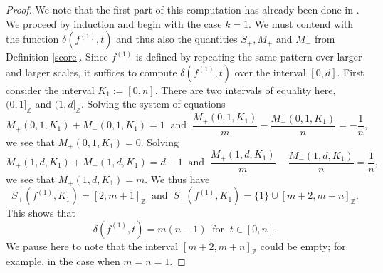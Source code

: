 \documentclass[reqno,11pt]{amsart}
\theoremstyle{plain}
\theoremstyle{definition}
\theoremstyle{remark}
\numberwithin{equation}{section}
\newcommand{\Z}{{\mathbb{Z}}}
\begin{document}
\begin{proof}
We note that the first part of this computation has already been done in \cite[Figure 4]{DFSU}.
We proceed by induction and begin with the case $k=1$. We must contend with the function $\delta(f^{(1)},t)$ and thus also the quantities $S_+, M_+$ and $M_-$ from Definition \ref{score}.
Since $f^{(1)}$ is defined by repeating the same pattern over larger and larger scales, it suffices to compute $\delta(f^{(1)}, t)$ over the interval $[0,d]$.
First consider the interval $K_1 := [0,n]$. There are two intervals of equality here, $(0, 1]_\Z$ and $(1,d]_\Z$.
Solving the system of equations
\begin{equation*}
    M_+(0,1,K_1) + M_-(0,1,K_1) = 1\ \text{ and }\ \frac{M_+(0,1,K_1)}{m} - \frac{M_-(0,1,K_1)}{n} = -\frac{1}{n},
\end{equation*}
we see that $M_+(0,1,K_1) = 0$.
Solving
\begin{equation*}
    M_+(1,d,K_1) + M_-(1,d,K_1) = d-1\ \text{ and }\ \frac{M_+(1,d,K_1)}{m} - \frac{M_-(1,d,K_1)}{n} = \frac{1}{n},
\end{equation*}
we see that $M_+(1,d,K_1) = m$.
We thus have
\begin{equation*}
    S_+(f^{(1)}, K_1)  = [2,m+1]_\Z\ \text{ and }\ S_-(f^{(1)}, K_1) = 
    \{1\} \cup [m+2, m+n]_\Z.
\end{equation*}
This shows that
\begin{equation}\label{delta-0n}
    \delta(f^{(1)}, t) = m(n-1)\ \text{ for }\ t \in [0,n].
\end{equation}
We pause here to note that the interval $[m+2, m+n]_\Z$ could be empty; for example, in the case when $m=n=1$.


\end{proof}
\end{document}
